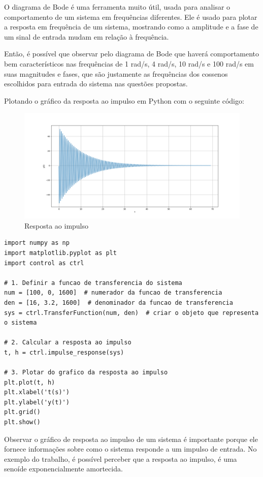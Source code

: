 \documentclass[10pt]{article}
\begin{document}
\quad O diagrama de Bode é uma ferramenta muito útil,
usada para analisar o comportamento de um sistema em frequências diferentes.
Ele é usado para plotar a resposta em frequência de um sistema,
mostrando como a amplitude e a fase de um sinal de entrada mudam em relação à frequência.

\quad Então, é possível que observar pelo diagrama de Bode que haverá comportamento bem característicos nas frequências de 1 rad/s,
4 rad/s, 10 rad/s e 100 rad/s em suas magnitudes e fases,
que são justamente as frequências dos cossenos escolhidos para entrada do sistema nas questões propostas.

\quad Plotando o gráfico da resposta ao impulso em Python com o seguinte código:

\begin{figure}[h]
    \centering
    \includegraphics[scale=0.4]{impulso.png}
    \caption{Resposta ao impulso}
\end{figure}

\begin{lstlisting}
import numpy as np
import matplotlib.pyplot as plt
import control as ctrl

# 1. Definir a funcao de transferencia do sistema
num = [100, 0, 1600]  # numerador da funcao de transferencia
den = [16, 3.2, 1600]  # denominador da funcao de transferencia
sys = ctrl.TransferFunction(num, den)  # criar o objeto que representa o sistema

# 2. Calcular a resposta ao impulso
t, h = ctrl.impulse_response(sys)

# 3. Plotar do grafico da resposta ao impulso
plt.plot(t, h)
plt.xlabel('t(s)')
plt.ylabel('y(t)')
plt.grid()
plt.show()
\end{lstlisting}

\quad Observar o gráfico de resposta ao impulso de um sistema é importante porque ele fornece informações sobre como o sistema responde a um impulso de entrada.
No exemplo do trabalho, é possível perceber que a resposta ao impulso, é uma senoíde exponencialmente amortecida.
\end{document}
